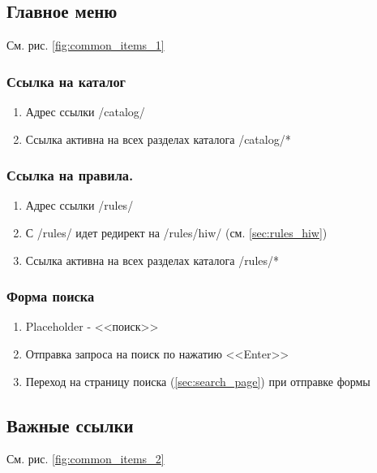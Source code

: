         \subsection{Главное меню}
            См. рис. \ref{fig:common_items_1}

            \label{sec:baseitems_main_meu}
            \subsubsection{Ссылка на каталог}
                \begin{enumerate}
                    \item Адрес ссылки /catalog/
                    \item Ссылка активна на всех разделах каталога /catalog/*
                \end{enumerate}
            \subsubsection{Ссылка на правила.}
                \begin{enumerate}
                    \item Адрес ссылки /rules/
                    \item С /rules/ идет редирект на /rules/hiw/ (см. \ref{sec:rules_hiw})
                    \item Ссылка активна на всех разделах каталога /rules/*
                \end{enumerate}
            
            \subsubsection{Форма поиска}
                \begin{enumerate}
                    \item Placeholder - <<поиск>>
                    \item Отправка запроса на поиск по нажатию <<Enter>>
                    \item Переход на страницу поиска (\ref{sec:search_page}) при отправке формы
                \end{enumerate}

       \subsection{Важные ссылки}
            \label{sec:baseitems_important_links}
            См. рис. \ref{fig:common_items_2}

